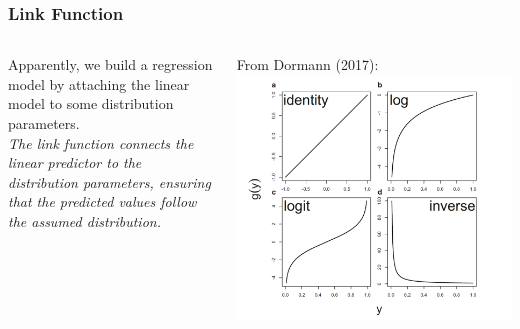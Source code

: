 \documentclass{beamer}
\begin{document}
\begin{frame}[fragile]
    \frametitle{Link Function}
    \large
    \begin{columns}
        \begin{column}{0.5\textwidth}
            Apparently, we build a regression model by attaching the linear model to some distribution parameters.\\
            \textit{The link function connects the linear predictor to the distribution parameters, ensuring that the predicted values follow the assumed distribution.}
        \end{column}
        \begin{column}{0.5\textwidth}
        From Dormann (2017):
            \includegraphics[width=\textwidth]{lectures/day_9_refreshing_glm/figures/links.png}
        \end{column}
    \end{columns}
\end{frame}
\end{document}
